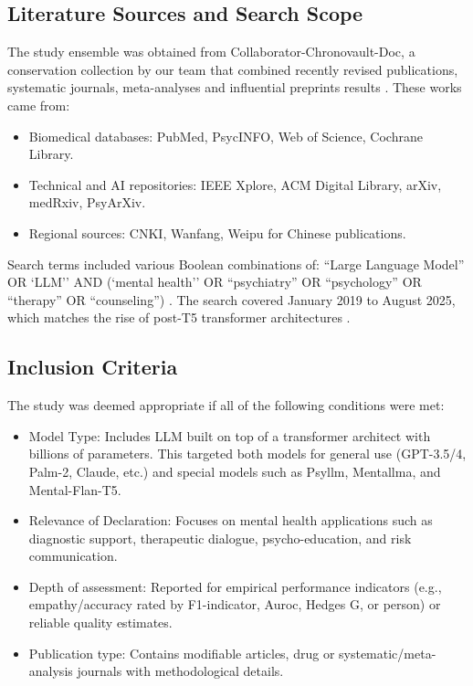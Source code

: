 \documentclass[sn-basic,authoryear]{sn-jnl}
\begin{document}
\subsection{Literature Sources and Search Scope}
The study ensemble was obtained from Collaborator-Chronovault-Doc, a conservation collection by our team that combined recently revised publications, systematic journals, meta-analyses and influential preprints results \cite{Hua2024b,JMIR2024,Zhong2024}. These works came from:
\begin{itemize}
    \item Biomedical databases: PubMed, PsycINFO, Web of Science, Cochrane Library.
    \item Technical and AI repositories: IEEE Xplore, ACM Digital Library, arXiv, medRxiv, PsyArXiv.
    \item Regional sources: CNKI, Wanfang, Weipu for Chinese publications.
\end{itemize}
Search terms included various Boolean combinations of:
``Large Language Model'' OR `LLM'' AND (`mental health'' OR ``psychiatry'' OR ``psychology'' OR ``therapy'' OR ``counseling'') \cite{Ibrahimov2024,Olawade2024}.  
The search covered January 2019 to August 2025, which matches the rise of post-T5 transformer architectures \cite{raffel2020t5}.

\subsection{Inclusion Criteria}
The study was deemed appropriate if all of the following conditions were met:
\begin{itemize}
    \item Model Type: Includes LLM built on top of a transformer architect with billions of parameters. This targeted both models for general use (GPT-3.5/4, Palm-2, Claude, etc.) and special models such as Psyllm, Mentallma, and Mental-Flan-T5.
    \item Relevance of Declaration: Focuses on mental health applications such as diagnostic support, therapeutic dialogue, psycho-education, and risk communication.
    \item Depth of assessment: Reported for empirical performance indicators (e.g., empathy/accuracy rated by F1-indicator, Auroc, Hedges G, or person) or reliable quality estimates.
    \item Publication type: Contains modifiable articles, drug or systematic/meta-analysis journals with methodological details.

\end{itemize}
\end{document}
